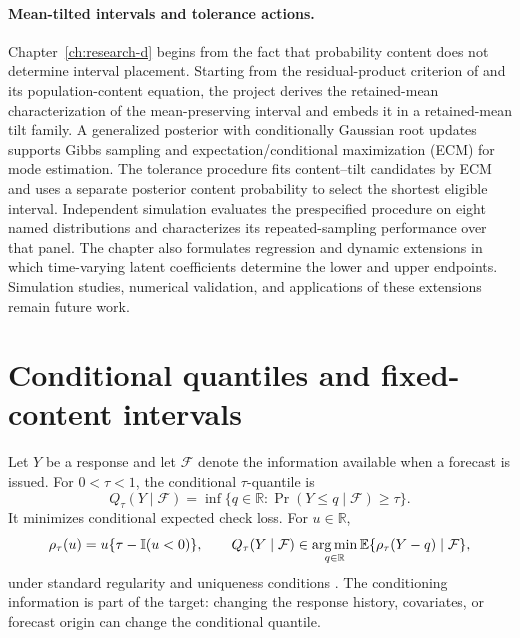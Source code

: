 \paragraph{Mean-tilted intervals and tolerance actions.}
Chapter~\ref{ch:research-d} begins from the fact that probability content does
not determine interval placement. Starting from the residual-product criterion
of \citet{rqr-PouplinEtAl2024RQR} and its population-content equation, the
project derives the retained-mean characterization of the mean-preserving
interval and embeds it in a retained-mean tilt family. A generalized posterior
with conditionally Gaussian root updates supports Gibbs sampling and
expectation/conditional maximization (ECM) for mode estimation.
The tolerance procedure fits content--tilt candidates by
ECM and uses a separate posterior content probability to select the shortest
eligible interval. Independent
simulation evaluates the prespecified procedure on eight named distributions
and characterizes its repeated-sampling performance over that panel. The
chapter also formulates regression and
dynamic extensions in which time-varying latent coefficients determine the
lower and upper endpoints. Simulation studies, numerical validation, and
applications of these extensions remain future work.

\section{Conditional quantiles and fixed-content intervals}
\label{sec:intro-targets}

Let \(Y\) be a response and let \(\mathcal F\) denote the information available
when a forecast is issued. For \(0<\tau<1\), the conditional \(\tau\)-quantile
is
\begin{equation}
Q_\tau(Y\mid\mathcal F)
=\inf\{q\in\mathbb R:\Pr(Y\le q\mid\mathcal F)\ge\tau\}.
\label{eq:intro-conditional-quantile}
\end{equation}
It minimizes conditional expected check loss. For \(u\in\mathbb R\),
\begin{equation}
\rho_\tau(u)=u\{\tau-\mathbb{I}(u<0)\},
\qquad
Q_\tau(Y\mid\mathcal F)
\in\operatorname*{arg\,min}_{q\in\mathbb R}
\mathbb{E}\{\rho_\tau(Y-q)\mid\mathcal F\},
\label{eq:intro-check-loss}
\end{equation}
under standard regularity and uniqueness conditions
\citep{qdesn-KoenkerBassett1978,qdesn-Koenker2005}. The conditioning
information is part of the target: changing the response history, covariates,
or forecast origin can change the conditional quantile.

